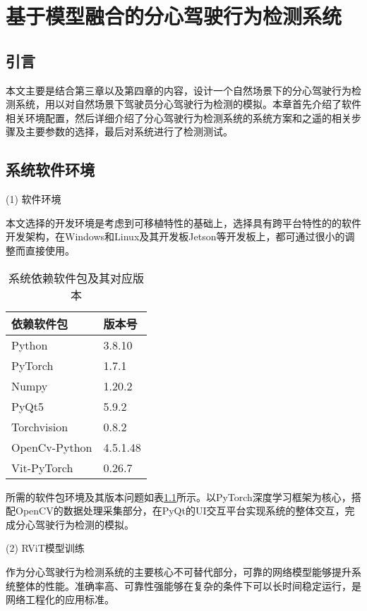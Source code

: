 \chapter{基于模型融合的分心驾驶行为检测系统}

\section{引言}

本文主要是结合第三章以及第四章的内容，设计一个自然场景下的分心驾驶行为检测系统，用以对自然场景下驾驶员分心驾驶行为检测的模拟。本章首先介绍了软件相关环境配置，然后详细介绍了分心驾驶行为检测系统的系统方案和之遥的相关步骤及主要参数的选择，最后对系统进行了检测测试。

\section{系统软件环境}

(1)	软件环境

本文选择的开发环境是考虑到可移植特性的基础上，选择具有跨平台特性的的软件开发架构，在Windows和Linux及其开发板Jetson等开发板上，都可通过很小的调整而直接使用。

\begin{table}[!ht]
	\caption{系统依赖软件包及其对应版本}
	\label{表5.1}
	\renewcommand{\arraystretch}{1.5}
	\centering
	\begin{tabular}{p{4.5cm}<{\centering}|p{4.5cm}<{\centering}}
		\bottomrule
		依赖软件包         & 版本号      \\ \hline
		Python        & 3.8.10   \\
		PyTorch       & 1.7.1    \\
		Numpy         & 1.20.2   \\
		PyQt5         & 5.9.2    \\
		Torchvision   & 0.8.2    \\
		OpenCv-Python & 4.5.1.48 \\
		Vit-PyTorch   & 0.26.7   \\ \bottomrule
	\end{tabular}
\end{table}


所需的软件包环境及其版本问题如表\ref{表5.1}所示。以PyTorch深度学习框架为核心，搭配OpenCV的数据处理采集部分，在PyQt的UI交互平台实现系统的整体交互，完成分心驾驶行为检测的模拟。

(2)	RViT模型训练

作为分心驾驶行为检测系统的主要核心不可替代部分，可靠的网络模型能够提升系统整体的性能。准确率高、可靠性强能够在复杂的条件下可以长时间稳定运行，是网络工程化的应用标准。

